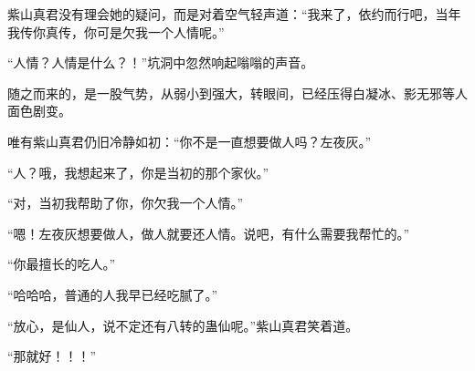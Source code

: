 \begin{this_body}
紫山真君没有理会她的疑问，而是对着空气轻声道：“我来了，依约而行吧，当年我传你真传，你可是欠我一个人情呢。”

“人情？人情是什么？！”坑洞中忽然响起嗡嗡的声音。

随之而来的，是一股气势，从弱小到强大，转眼间，已经压得白凝冰、影无邪等人面色剧变。

唯有紫山真君仍旧冷静如初：“你不是一直想要做人吗？左夜灰。”

“人？哦，我想起来了，你是当初的那个家伙。”

“对，当初我帮助了你，你欠我一个人情。”

“嗯！左夜灰想要做人，做人就要还人情。说吧，有什么需要我帮忙的。”

“你最擅长的吃人。”

“哈哈哈，普通的人我早已经吃腻了。”

“放心，是仙人，说不定还有八转的蛊仙呢。”紫山真君笑着道。

“那就好！！！”

\end{this_body}


